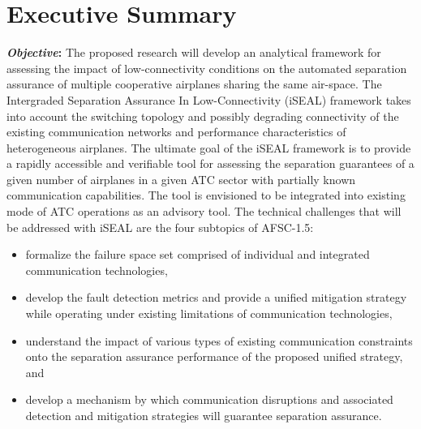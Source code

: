 \documentclass[letter,onecolumn,12pt]{aiaa-tc}
\begin{document}
\pagestyle{empty}

%

%


\section*{Executive Summary}

\textbf{\emph{Objective}:} The proposed research will develop an analytical framework for assessing the impact of low-connectivity conditions on the automated separation assurance of multiple cooperative airplanes sharing the same air-space. The Intergraded Separation Assurance In Low-Connectivity (iSEAL) framework takes into account the switching topology and possibly degrading connectivity of the existing communication networks and performance characteristics of heterogeneous airplanes. The ultimate goal of the iSEAL framework is to provide a rapidly accessible and verifiable tool for assessing the separation guarantees of a given number of airplanes in a given ATC sector with partially known communication capabilities. The tool is envisioned to be integrated into existing mode of ATC operations as an advisory tool. The technical challenges that will be addressed with iSEAL are the four subtopics of AFSC-1.5:
\begin{itemize}
\setlength{\itemsep}{-4pt}
    \item formalize the failure space set comprised of individual and integrated communication technologies,
    \item develop the fault detection metrics and provide a unified mitigation strategy while operating under existing  limitations of communication technologies,
    \item understand the impact of various types of existing communication constraints onto the separation assurance performance of the proposed unified strategy, and
    \item develop a mechanism by which communication disruptions and associated detection and mitigation strategies will guarantee separation assurance.
\end{itemize}
\end{document}
